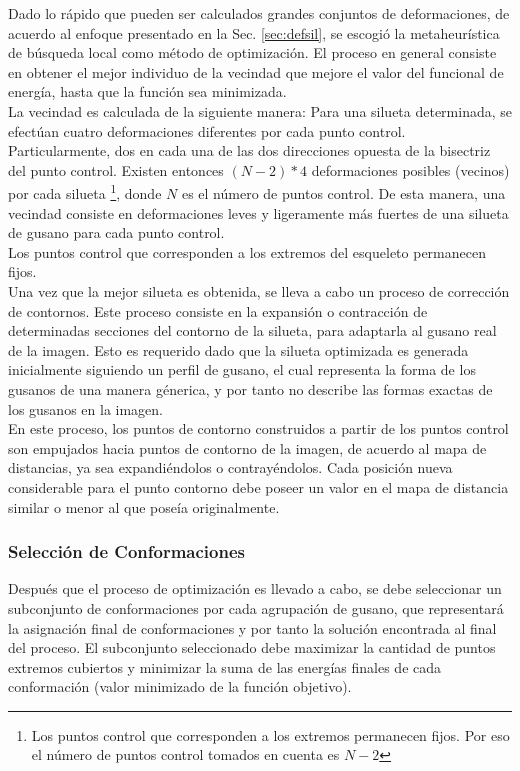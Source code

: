 Dado lo r\'apido que pueden ser calculados grandes conjuntos de deformaciones,
de acuerdo al enfoque presentado en la Sec. \ref{sec:defsil}, se escogi\'o
la metaheur\'istica de b\'usqueda local como m\'etodo de optimizaci\'on.
El proceso en general consiste en obtener el mejor individuo de la vecindad
que mejore el valor del funcional de energ\'ia, hasta que la funci\'on sea
minimizada.\\
La vecindad es calculada de la siguiente manera:
Para una silueta determinada, se efect\'uan cuatro deformaciones diferentes por cada punto
control. Particularmente, dos en cada una de las dos direcciones opuesta de la bisectriz
del punto control. Existen entonces $(N-2)*4$  
deformaciones posibles (vecinos) por cada silueta \footnote{Los puntos control que corresponden 
a los extremos permanecen fijos. Por eso el n\'umero de puntos control tomados en cuenta es $N-2$}, 
donde $N$ es el n\'umero de puntos control. De esta manera, una vecindad consiste en deformaciones
leves y ligeramente m\'as fuertes de una silueta de gusano para cada punto control.\\ 
Los puntos control que corresponden a los extremos del esqueleto permanecen fijos.\\

Una vez que la mejor silueta es obtenida, se lleva a cabo un proceso de correcci\'on
de contornos. Este proceso consiste en la expansi\'on o contracci\'on de determinadas 
secciones del contorno de la silueta, para adaptarla al gusano real de la imagen.
Esto es requerido dado que la silueta optimizada es generada inicialmente siguiendo un 
perfil de gusano, el cual representa la forma de los gusanos de una manera g\'enerica, y
por tanto no describe las formas exactas de los gusanos en la imagen.\\
En este proceso, los puntos de contorno construidos a partir de los puntos control son
empujados hacia puntos de contorno de la imagen, de acuerdo al mapa de distancias, ya
sea expandi\'endolos o contray\'endolos. Cada posici\'on nueva considerable para el punto
contorno debe poseer un valor en el mapa de distancia similar o menor al que pose\'ia
originalmente.

\subsubsection*{Selecci\'on de Conformaciones}

Despu\'es que el proceso de optimizaci\'on es llevado a cabo, se debe seleccionar
un subconjunto de conformaciones por cada agrupaci\'on de gusano, que representar\'a
la asignaci\'on final de conformaciones y por tanto la soluci\'on encontrada al final
del proceso. El subconjunto seleccionado debe maximizar la cantidad
de puntos extremos cubiertos y minimizar la suma de las energ\'ias finales de
cada conformaci\'on (valor minimizado de la funci\'on objetivo).\\

